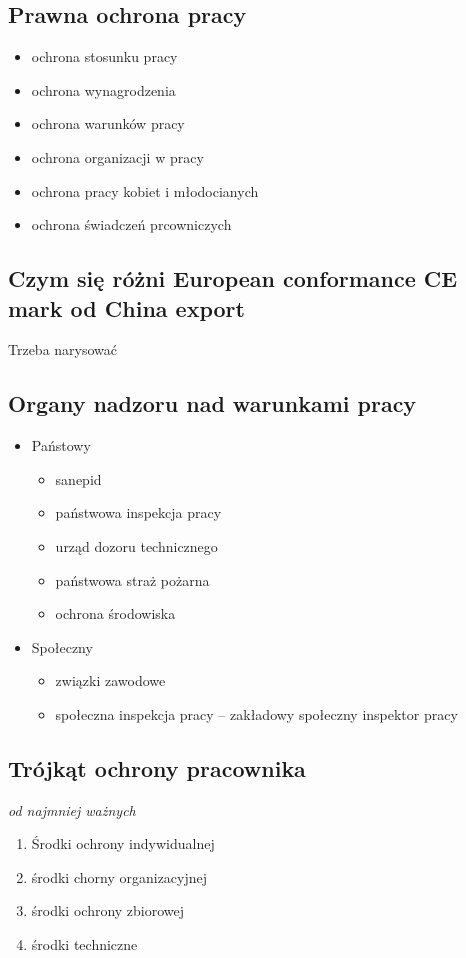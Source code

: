 \documentclass[11pt]{article}
\begin{document}
\subsection{Prawna ochrona pracy}
\label{sec:orgd795fb4}
\begin{itemize}
\item ochrona stosunku pracy
\item ochrona wynagrodzenia
\item ochrona warunków pracy
\item ochrona organizacji w pracy
\item ochrona pracy kobiet i młodocianych
\item ochrona świadczeń prcowniczych
\end{itemize}
\subsection{Czym się różni European conformance CE mark od China export}
\label{sec:org7b5381a}
Trzeba narysować
\subsection{Organy nadzoru nad warunkami pracy}
\label{sec:orgddc9ef8}
\begin{itemize}
\item Państowy
\begin{itemize}
\item sanepid
\item państwowa inspekcja pracy
\item urząd dozoru technicznego
\item państwowa straż pożarna
\item ochrona środowiska
\end{itemize}
\item Społeczny
\begin{itemize}
\item związki zawodowe
\item społeczna inspekcja pracy -- zakładowy społeczny inspektor pracy
\end{itemize}
\end{itemize}
\subsection{Trójkąt ochrony pracownika}
\label{sec:orgdab5f58}
\emph{od najmniej ważnych}
\begin{enumerate}
\item Środki ochrony indywidualnej
\item środki chorny organizacyjnej
\item środki ochrony zbiorowej
\item środki techniczne
\end{enumerate}
\end{document}
